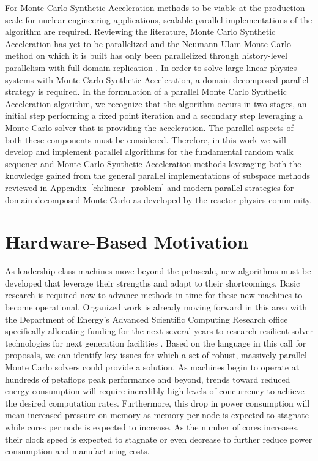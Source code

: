 For Monte Carlo Synthetic Acceleration methods to be viable at the
production scale for nuclear engineering applications, scalable
parallel implementations of the algorithm are required. Reviewing the
literature, Monte Carlo Synthetic Acceleration has yet to be
parallelized and the Neumann-Ulam Monte Carlo method on which it is
built has only been parallelized through history-level parallelism
with full domain replication \cite{alexandrov_efficient_1998}. In
order to solve large linear physics systems with Monte Carlo Synthetic
Acceleration, a domain decomposed parallel strategy is required. In
the formulation of a parallel Monte Carlo Synthetic Acceleration
algorithm, we recognize that the algorithm occurs in two stages, an
initial step performing a fixed point iteration and a secondary step
leveraging a Monte Carlo solver that is providing the
acceleration. The parallel aspects of both these components must be
considered. Therefore, in this work we will develop and implement
parallel algorithms for the fundamental random walk sequence and Monte
Carlo Synthetic Acceleration methods leveraging both the knowledge
gained from the general parallel implementations of subspace methods
reviewed in Appendix~\ref{ch:linear_problem} and modern parallel
strategies for domain decomposed Monte Carlo as developed by the
reactor physics community.

\section{Hardware-Based Motivation}
\label{sec:hardware_motivation}
As leadership class machines move beyond the petascale, new algorithms
must be developed that leverage their strengths and adapt to their
shortcomings. Basic research is required now to advance methods in
time for these new machines to become operational. Organized work is
already moving forward in this area with the Department of Energy's
Advanced Scientific Computing Research office specifically allocating
funding for the next several years to research resilient solver
technologies for next generation facilities
\cite{u.s._department_of_energy_resilient_2012}. Based on the language
in this call for proposals, we can identify key issues for which a set
of robust, massively parallel Monte Carlo solvers could provide a
solution. As machines begin to operate at hundreds of petaflops peak
performance and beyond, trends toward reduced energy consumption will
require incredibly high levels of concurrency to achieve the desired
computation rates. Furthermore, this drop in power consumption will
mean increased pressure on memory as memory per node is expected to
stagnate while cores per node is expected to increase. As the number
of cores increases, their clock speed is expected to stagnate or even
decrease to further reduce power consumption and manufacturing costs.

